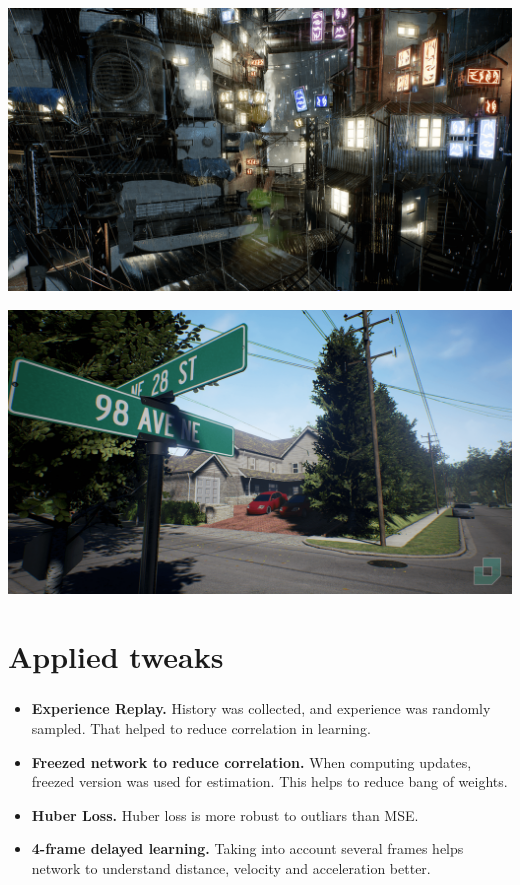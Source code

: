 \documentclass[t]{beamer}
\begin{document}
\begin{frame}
	\frametitle{\insertsection}
	\includegraphics[scale=0.1]{images/city.png}

	\includegraphics[scale=0.1]{images/neighborhood.png}
\end{frame}

\section{Applied tweaks}

\begin{frame}
	\frametitle{\insertsection}
	\begin{itemize}
	    \item {\bf Experience Replay.} History was collected, and experience was randomly sampled. That helped to reduce correlation in learning.
	    \item {\bf Freezed network to reduce correlation.} When computing updates, freezed version was used for estimation. This helps
	        to reduce bang of weights.
	    \item {\bf Huber Loss.} Huber loss is more robust
	        to outliars than MSE.
	    \item {\bf 4-frame delayed learning.}
	        Taking into account several frames helps network to understand
	        distance, velocity and acceleration better.
	\end{itemize}
\end{frame}
\end{document}

